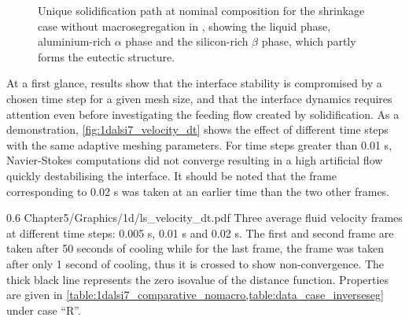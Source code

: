 \begin{figure}[htbp]
\centering
{}

\caption{Unique solidification path at nominal composition for the shrinkage case without macrosegregation in ,
showing the liquid phase, aluminium-rich $\alpha$ phase and the silicon-rich $\beta$ phase, which partly forms the eutectic structure.}
\label{fig:shrinkage_nomacro_sp}
\end{figure}

At a first glance, results show that the interface stability is compromised by a chosen time step for a given mesh size, and that the interface dynamics
requires attention even before investigating the feeding flow created by solidification. As a demonstration, \cref{fig:1dalsi7_velocity_dt} shows the effect of different
time steps with the same adaptive meshing parameters. For time steps greater than 0.01 s, Navier-Stokes computations did not converge resulting in a high artificial 
flow quickly destabilising the interface. It should be noted that the frame corresponding to 0.02 s was taken at an earlier time than the two other frames.

\begin{figureth}
{0.6}
{Chapter5/Graphics/1d/ls_velocity_dt.pdf}
{Three average fluid velocity frames at different time steps: 0.005 s, 0.01 s and 0.02 s. The first and second frame are taken after 
50 seconds of cooling while for the last frame, the frame was taken after only 1 second of cooling, thus it is crossed to show non-convergence.
The thick black line represents the zero isovalue of the distance function. Properties are given in \cref{table:1dalsi7_comparative_nomacro,table:data_case_inverseseg}
under case ``R''.}
\label{fig:1dalsi7_velocity_dt}
\end{figureth}

